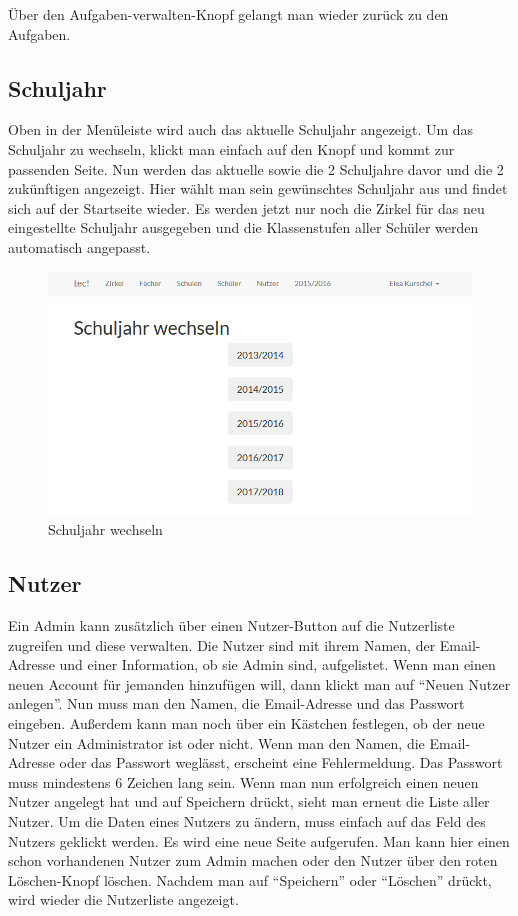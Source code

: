 Über den Aufgaben-verwalten-Knopf gelangt man wieder zurück zu den Aufgaben.

\newpage \subsection{Schuljahr}
Oben in der Menüleiste wird auch das aktuelle Schuljahr angezeigt. Um das Schuljahr zu wechseln, klickt man einfach auf den Knopf und kommt zur passenden Seite. Nun werden das aktuelle sowie die 2 Schuljahre davor und die 2 zukünftigen angezeigt. Hier wählt man sein gewünschtes Schuljahr aus und findet sich auf der Startseite wieder. Es werden jetzt nur noch die Zirkel für das neu eingestellte Schuljahr ausgegeben und die Klassenstufen aller Schüler werden automatisch angepasst.

\begin{figure}[h]
	\centering
	\includegraphics[scale=.40]{bilder/Schuljahr.png}
	\caption{Schuljahr wechseln}
\end{figure}

\subsection{Nutzer}
Ein Admin kann zusätzlich über einen Nutzer-Button auf die Nutzerliste zugreifen und diese verwalten. Die Nutzer sind mit ihrem Namen, der Email-Adresse und einer Information, ob sie Admin sind, aufgelistet. Wenn man einen neuen Account für jemanden hinzufügen will, dann klickt man auf "`Neuen Nutzer anlegen"'. Nun muss man den Namen, die Email-Adresse und das Passwort eingeben. Außerdem kann man noch über ein Kästchen festlegen, ob der neue Nutzer ein Administrator ist oder nicht. Wenn man den Namen, die Email-Adresse oder das Passwort weglässt, erscheint eine Fehlermeldung. Das Passwort muss mindestens 6 Zeichen lang sein. Wenn man nun erfolgreich einen neuen Nutzer angelegt hat und auf Speichern drückt, sieht man erneut die Liste aller Nutzer. Um die Daten eines Nutzers zu ändern, muss einfach auf das Feld des Nutzers geklickt werden. Es wird eine neue Seite aufgerufen. Man kann hier einen schon vorhandenen Nutzer zum Admin machen oder den Nutzer über den roten Löschen-Knopf löschen. Nachdem man auf "`Speichern"' oder "`Löschen"' drückt, wird wieder die Nutzerliste angezeigt. 


